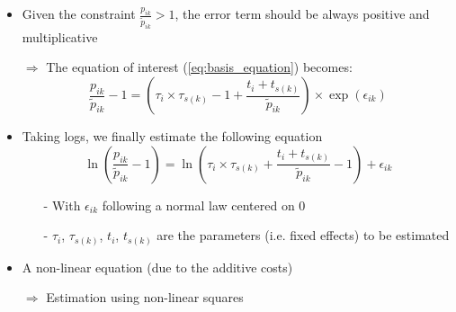 \documentclass[10 pt,Helvetica, french]{beamer}
\begin{document}
\begin{frame}[label=slide_estimation_method]
\begin{itemize}
\item Given the constraint $\frac{p_{ik}}{\widetilde{p}_{ik}} >1$, the error term should be always positive and multiplicative \vspace{0.1cm}
\item[$\Rightarrow$] The equation of interest (\ref{eq:basis_equation}) becomes:
\footnotesize
$$\frac{p_{ik}}{\widetilde{p}_{ik}}-1 =\left(\tau_{i} \times \tau_{s(k)} -1+\frac{t_{i} + t_{s(k)}}{\widetilde{p}_{ik}} \right)\times \exp(\epsilon_{ik})$$
\normalsize
\item Taking logs, we finally estimate the following equation
\footnotesize
\begin{equation*}
\ln\left(\frac{p_{ik}}{\widetilde{p}_{ik}}-1 \right)= \ln \left(\tau_{i} \times \tau_{s(k)}+\frac{t_{i} + t_{s(k)}}{\widetilde{p}_{ik}}-1 \right) + \epsilon_{ik}
\end{equation*}
\normalsize
\begin{itemize}
\item[-] With $\epsilon_{ik}$ following a normal law centered on 0  \vspace{0.1cm}
\item[-] $\tau_i$, $\tau_{s(k)}$, $t_i$, $t_{s(k)}$ are the parameters (i.e. fixed effects) to be estimated
\end{itemize}
\item A non-linear equation (due to the additive costs)  \vspace{0.1cm}
\item[$\Rightarrow$] Estimation using non-linear squares \hyperlink{app_estimation_method}{}\vspace{0.1cm}

\end{itemize}
\end{frame}
\end{document}
